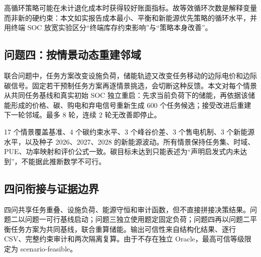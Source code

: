 高循环策略可能在未计退化成本时获得较好账面指标。故等效循环次数是解释变量而非新的硬约束：本文如实报告成本最小、平衡和新能源优先策略的循环水平，并用终端 SOC 放宽实验区分“终端库存约束影响”与“策略本身改善”。

\subsection{问题四：按情景动态重建邻域}
联合问题中，任务方案改变设施负荷，储能轨迹又改变任务移动的边际电价和边际碳信号。固定若干预制任务方案再逐情景挑选，会切断这种反馈。本文对每个情景从共同任务基线和真实初始 SOC 独立重启：先求当前负荷下的储能，再依据该储能形成的价格、碳、购电和弃电信号重新生成 600 个任务候选；接受改进后重建下一轮邻域。最多 8 轮，连续 2 轮无改善即停止。

17 个情景覆盖基准、4 个碳约束水平、3 个峰谷价差、3 个售电机制、3 个新能源水平，以及种子 2026、2027、2028 的新能源波动。所有情景保持任务集、时域、PUE、功率映射和评价公式一致。碳目标未达到只能表述为“声明启发式内未达到”，不能据此推断数学不可行。

\subsection{四问衔接与证据边界}
四问共享任务重叠、设施负荷、能源守恒和审计函数，但不直接拼接决策结果。问题二以问题一可行基线启动；问题三独立使用题定固定负荷；问题四再以问题二平衡任务方案为共同基线，联合重算储能。输出可信性来自结构化结果、逐行 CSV、完整约束审计和两次隔离复算。由于不存在独立 Oracle，最高可信等级限定为 scenario-feasible。
